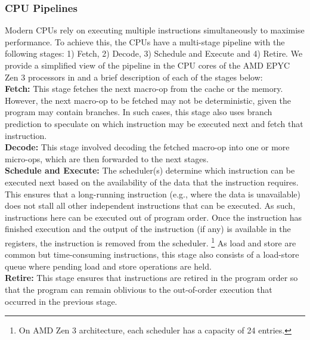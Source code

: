\subsubsection{CPU Pipelines}
Modern CPUs rely on executing multiple instructions simultaneously to maximise performance.
To achieve this, the CPUs have a multi-stage pipeline with the following stages: 1) Fetch, 2) Decode, 3) Schedule and Execute and 4) Retire.
We provide a simplified view of the pipeline in the CPU cores of the AMD EPYC Zen 3 processors in  and a brief description of each of the stages below:\\
\textbf{Fetch: } This stage fetches the next macro-op from the cache or the memory. 
However, the next macro-op to be fetched may not be deterministic, given the program may contain branches. 
In such cases, this stage also uses branch prediction to speculate on which instruction may be executed next and fetch that instruction.\\
\textbf{Decode: } This stage involved decoding the fetched macro-op into one or more micro-ops, which are then forwarded to the next stages.\\
\textbf{Schedule and Execute: } The scheduler(s) determine which instruction can be executed next based on the availability of the data that the instruction requires. 
This ensures that a long-running instruction (e.g., where the data is unavailable) does not stall all other independent instructions that can be executed.
As such, instructions here can be executed out of program order. 
Once the instruction has finished execution and the output of the instruction (if any) is available in the registers, the instruction is removed from the scheduler. 
\footnote{On AMD Zen 3 architecture, each scheduler has a capacity of 24 entries.}
As load and store are common but time-consuming instructions, this stage also consists of a load-store queue where pending load and store operations are held. \\
\textbf{Retire: } This stage ensures that instructions are retired in the program order so that the program can remain oblivious to the out-of-order execution that occurred in the previous stage.

